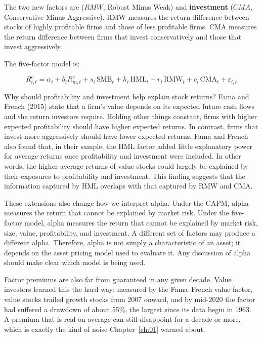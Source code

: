 The two new factors are   ($RMW$, Robust Minus Weak) and
\textbf{investment} ($CMA$, Conservative Minus Aggressive). RMW measures the return difference between stocks of
highly profitable firms and those of less profitable firms. CMA measures the return difference between firms that invest conservatively
and those that invest aggressively. 

The five-factor model is:

\begin{equation}
  R^{e}_{i,t} = \alpha_i + b_i R^{e}_{m,t} + s_i \,\mathrm{SMB}_t + h_i \,\mathrm{HML}_t + r_i \,\mathrm{RMW}_t + c_i \,\mathrm{CMA}_t + \varepsilon_{i,t}
  \label{eq:04-ff5}
\end{equation}

Why should profitability and investment help explain stock returns? Fama and French (2015) state that a firm's value depends on its expected future cash flows and the return investors require.
Holding other things constant, firms with higher expected profitability should have higher expected returns. In contrast, firms that invest
more aggressively should have lower expected returns. 
Fama and French also found that, in their sample, the
HML factor added little explanatory power for average returns once profitability and investment were included. In other words, the
higher average returns of value stocks could largely be explained by their exposures to profitability and investment. This finding suggests
that the information captured by HML overlaps with that captured by RMW and CMA.

These extensions also change how we interpret alpha. Under the CAPM, alpha measures the return that cannot be explained by market risk.
Under the five-factor model, alpha measures the return that cannot be explained by market risk, size, value, profitability, and investment.
A different set of factors may produce a different alpha. Therefore, alpha is not simply a characteristic of an asset; it depends on the
asset pricing model used to evaluate it. Any discussion of alpha should make clear which model is being used.

Factor premiums are also far from guaranteed in any given decade. Value investors learned this the hard way: measured by the Fama--French value factor, value stocks trailed growth stocks from 2007 onward, and by mid-2020 the factor had suffered a drawdown of about 55\%, the largest since its data begin in 1963. A premium that is real on average can still disappoint for a decade or more, which is exactly the kind of noise Chapter~\ref{ch:01} warned about.


